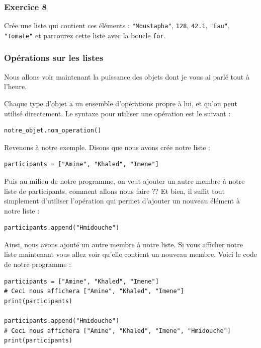 \documentclass[12pt]{article}
\newcommand{\code}[1]{\colorbox{light-gray}{\texttt{#1}}}
\begin{document}
        \subsubsection{Exercice 8}
            Crée une liste qui contient ces éléments : \code{"Moustapha"}, \code{128}, \code{42.1}, \code{"Eau"},
            \code{"Tomate"}
            et parcourez cette liste avec la boucle \code{for}.


        \subsubsection{Opérations sur les listes}
            Nous allons voir maintenant la puissance des objets dont je vous ai parlé tout à l'heure.

            Chaque type d'objet a un ensemble d'opérations propre à lui, et qu'on peut utilisé directement.
            Le syntaxe pour utiliser une opération est le suivant :
            \begin{lstlisting}[style=code]
notre_objet.nom_operation()
            \end{lstlisting}

            Revenons à notre exemple. Disons que nous avons crée notre liste :
            \begin{lstlisting}[style=code]
participants = ["Amine", "Khaled", "Imene"]
            \end{lstlisting}

            Puis au milieu de notre programme, on veut ajouter un autre membre à notre liste de participants, comment
            allons nous faire ?? Et bien, il suffit tout simplement d'utiliser l'opération qui permet d'ajouter
            un nouveau élément à notre liste :
            \begin{lstlisting}[style=code]
participants.append("Hmidouche")
            \end{lstlisting}

            Ainsi, nous avons ajouté un autre membre à notre liste. Si vous afficher notre liste maintenant vous
            allez voir qu'elle contient un nouveau membre. Voici le code de notre programme :
            \begin{lstlisting}[style=code]
participants = ["Amine", "Khaled", "Imene"]
# Ceci nous affichera ["Amine", "Khaled", "Imene"]
print(participants)

participants.append("Hmidouche")
# Ceci nous affichera ["Amine", "Khaled", "Imene", "Hmidouche"]
print(participants)
            \end{lstlisting}
\end{document}
